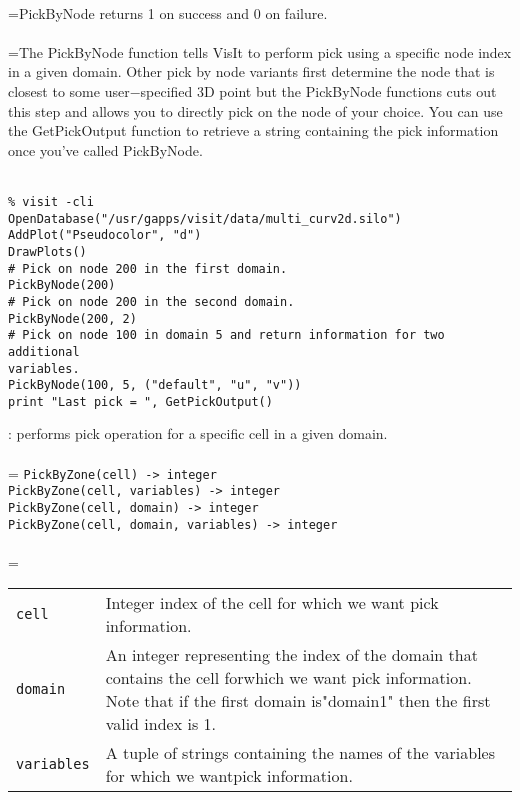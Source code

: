 \documentclass[10pt,a4paper]{report}
\begin{document}
 \\ 
\hangindent=\parindent PickByNode returns 1 on success and 0 on failure. \\[-3mm] 

 \\ 
\hangindent=\parindent The PickByNode function tells VisIt to perform pick using a specific node index in a given domain. Other pick by node variants first determine the node that is closest to some user$-$specified 3D point but the PickByNode functions cuts out this step and allows you to directly pick on the node of your choice. You can use the GetPickOutput function to retrieve a string containing the pick information once you've called PickByNode. \\[-3mm] 

\\[-6mm]
\begin{verbatim}% visit -cli
OpenDatabase("/usr/gapps/visit/data/multi_curv2d.silo")
AddPlot("Pseudocolor", "d")
DrawPlots()
# Pick on node 200 in the first domain.
PickByNode(200)
# Pick on node 200 in the second domain.
PickByNode(200, 2)
# Pick on node 100 in domain 5 and return information for two additional
variables.
PickByNode(100, 5, ("default", "u", "v"))
print "Last pick = ", GetPickOutput()
\end{verbatim}
\newpage


{}
: performs pick operation for a specific cell in a given domain.\\[-3mm]

 \\ 
\hangindent=\parindent 
\verb!PickByZone(cell) -> integer!\\ 
\verb!PickByZone(cell, variables) -> integer!\\ 
\verb!PickByZone(cell, domain) -> integer!\\ 
\verb!PickByZone(cell, domain, variables) -> integer!\\ [-3mm]

 \\ 
\hangindent=\parindent 
\begin{tabular}{lp{9cm}}
\verb!cell! & Integer index of the cell for which we want pick information. \\
\verb!domain! & An integer representing the index of the domain that contains the cell forwhich we want pick information. Note that if the first domain is"domain1" then the first valid index is 1. \\
\verb!variables! & A tuple of strings containing the names of the variables for which we wantpick information. \\
\end{tabular} \\[-2mm]
\end{document}
